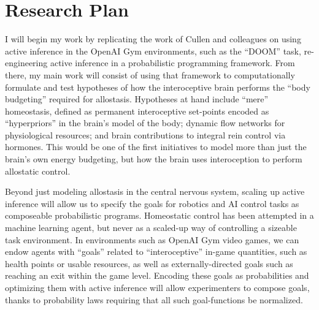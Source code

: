 
\section*{Research Plan}
\begin{singlespace}
\im
I will begin my work by replicating the work of Cullen and colleagues on
using active inference in the OpenAI Gym environments, such as the ``DOOM''
task\cite{Cullen2018}, re-engineering active inference in a probabilistic
programming framework.  From there, my main work will consist of using that
framework to computationally formulate and test hypotheses of how the
interoceptive brain performs the ``body budgeting'' required for allostasis.
Hypotheses at hand include ``mere'' homeostasis, defined as permanent
interoceptive set-points encoded as ``hyperpriors'' in the brain's model of
the body\cite{Morville2018a}; dynamic flow networks for physiological
resources; and brain contributions to integral rein control via hormones\cite{SAUNDERS1998}.  This would be one
of the first initiatives to model more than just the brain's own energy
budgeting, but how the brain uses interoception to perform allostatic
control\cite{Sterling2012,Sterling2015,Christie2015}.
\end{singlespace}

\begin{singlespace}
\im
Beyond just modeling allostasis in the central nervous system, scaling
up active inference will allow us to specify the goals for robotics and AI
control tasks as composeable probabilistic programs.  Homeostatic control has
been attempted in a machine learning agent, but never as a scaled-up way
of controlling a sizeable task environment\cite{Penny}.  In environments such
as OpenAI Gym video games, we can endow agents with ``goals'' related to
``interoceptive'' in-game quantities, such as health points or usable
resources, as well as externally-directed goals such as reaching an exit
within the game level.  Encoding these goals as probabilities and optimizing
them with active inference will allow experimenters to compose goals, thanks
to probability laws requiring that all such goal-functions be normalized.
\end{singlespace}


